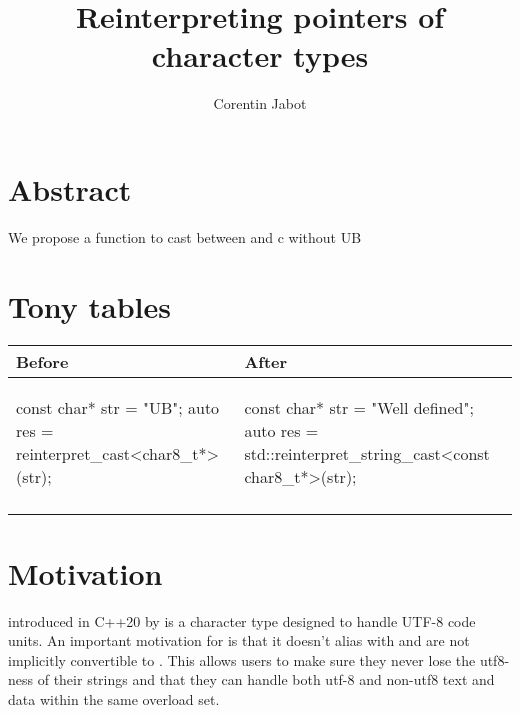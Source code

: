 \documentclass{wg21}
\title{Reinterpreting pointers of character types}
\author{Corentin Jabot}{corentin.jabot@gmail.com}
\begin{document}
\maketitle


\section{Abstract}

We propose a function  to cast between  and c without UB

\section{Tony tables}
\begin{center}
\begin{tabular}{l|l}
Before & After\\ \hline

\begin{minipage}[t]{0.45\textwidth}
\begin{colorblock}
const char* str = "UB";
auto res = reinterpret_cast<char8_t*>(str);
\end{colorblock}
\end{minipage}
&
\begin{minipage}[t]{0.5\textwidth}
\begin{colorblock}
const char* str = "Well defined";
auto res = std::reinterpret_string_cast<const char8_t*>(str);
\end{colorblock}
\end{minipage}
\\\\ \hline

\end{tabular}
\end{center}


\section{Motivation}

 introduced in C++20 by  is a character type designed to handle UTF-8 code units.
An important motivation for  is that it doesn't alias with  and  are not implicitly convertible to .
This allows users to make sure they never lose the utf8-ness of their strings and that they can handle both utf-8 and non-utf8 text and data within the same overload set.
\end{document}

